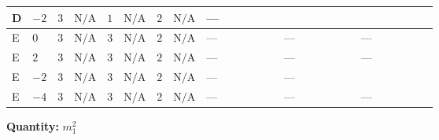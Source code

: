 \documentclass[8pt]{article}
\begin{document}
\begin{landscape}
\begin{longtable}{@{}llcccccc >{\raggedright\arraybackslash}p{0.21\linewidth} >{\raggedright\arraybackslash}p{0.21\linewidth} >{\raggedright\arraybackslash}p{0.21\linewidth}@{}}
D & $-2$ & $3$ & $\text{N/A}$ & $1$ & $\text{N/A}$ & $2$ & $\text{N/A}$ & --- & \scriptsize\adjustbox{max width=\linewidth}{$\begin{gathered} 4 {\mu_{\mathrm{T3GeneralS2Sq}}} \left({\lambda_{X_{7}}^{(1)}}\right)^{*}\end{gathered}$} & \scriptsize\adjustbox{max width=\linewidth}{$\begin{gathered} +4 {\lambda_{X_{7}}^{(1)}} \left({\mu_{\mathrm{T3GeneralS2Sq}}}\right)^{*}\end{gathered}$} \\
\midrule
E & $0$ & $3$ & $\text{N/A}$ & $3$ & $\text{N/A}$ & $2$ & $\text{N/A}$ & --- & --- & --- \\
\midrule
E & $2$ & $3$ & $\text{N/A}$ & $3$ & $\text{N/A}$ & $2$ & $\text{N/A}$ & --- & --- & --- \\
\midrule
E & $-2$ & $3$ & $\text{N/A}$ & $3$ & $\text{N/A}$ & $2$ & $\text{N/A}$ & --- & --- & \scriptsize\adjustbox{max width=\linewidth}{$\begin{gathered} +12 {\lambda_{X_{7}}^{(1)}} \left({\mu_{\mathrm{T3GeneralS2Sq}}}\right)^{*} \\ +4 {\lambda_{X_{7}}^{(2)}} \left({\mu_{\mathrm{T3GeneralS2Sq}}}\right)^{*}\end{gathered}$} \\
\midrule
E & $-4$ & $3$ & $\text{N/A}$ & $3$ & $\text{N/A}$ & $2$ & $\text{N/A}$ & --- & --- & --- \\
\midrule
\bottomrule
\end{longtable}
\clearpage
\noindent\textbf{Quantity: }$m_1^2$\par\smallskip

\end{landscape}
\end{document}
